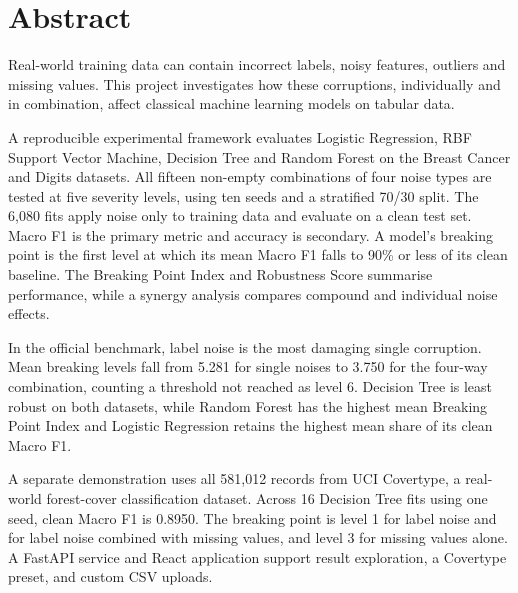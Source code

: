 \chapter*{Abstract}

Real-world training data can contain incorrect labels, noisy features, outliers and missing values. This project investigates how these corruptions, individually and in combination, affect classical machine learning models on tabular data.

A reproducible experimental framework evaluates Logistic Regression, RBF Support Vector Machine, Decision Tree and Random Forest on the Breast Cancer and Digits datasets. All fifteen non-empty combinations of four noise types are tested at five severity levels, using ten seeds and a stratified 70/30 split. The 6,080 fits apply noise only to training data and evaluate on a clean test set. Macro F1 is the primary metric and accuracy is secondary. A model's breaking point is the first level at which its mean Macro F1 falls to 90\% or less of its clean baseline. The Breaking Point Index and Robustness Score summarise performance, while a synergy analysis compares compound and individual noise effects.

In the official benchmark, label noise is the most damaging single corruption. Mean breaking levels fall from 5.281 for single noises to 3.750 for the four-way combination, counting a threshold not reached as level 6. Decision Tree is least robust on both datasets, while Random Forest has the highest mean Breaking Point Index and Logistic Regression retains the highest mean share of its clean Macro F1.

A separate demonstration uses all 581,012 records from UCI Covertype, a real-world forest-cover classification dataset. Across 16 Decision Tree fits using one seed, clean Macro F1 is 0.8950. The breaking point is level 1 for label noise and for label noise combined with missing values, and level 3 for missing values alone. A FastAPI service and React application support result exploration, a Covertype preset, and custom CSV uploads.
